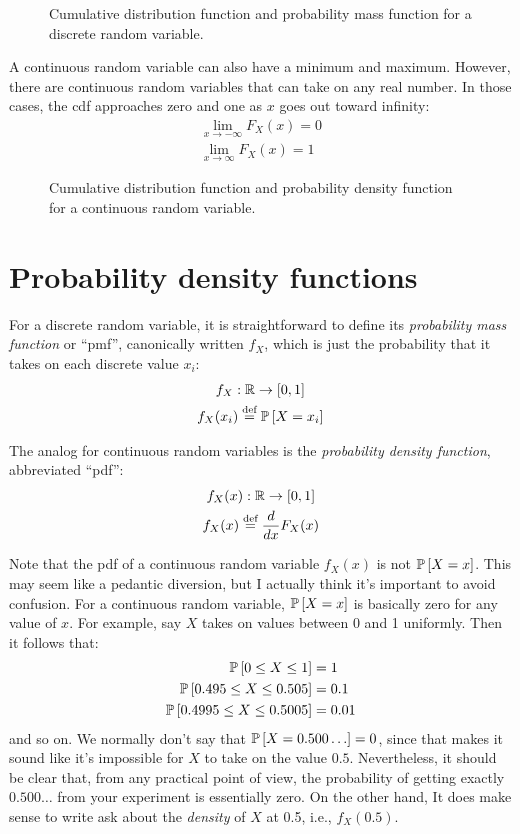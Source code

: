 \begin{figure}
    \centering
    \caption{Cumulative distribution function and probability mass function for a discrete random variable.}
    \label{fig:discrete-cdf}
\end{figure}

A continuous random variable can also have a minimum and maximum. However,
there are continuous random variables that can take on any real number. In
those cases, the cdf approaches zero and one as $x$ goes out toward infinity:
\begin{gather*}
\lim_{x \to -\infty} F_X(x) = 0 \\
\lim_{x \to \infty} F_X(x) = 1
\end{gather*}

\begin{figure}
    \centering
    \caption{Cumulative distribution function and probability density function for a continuous random variable.}
    \label{fig:continuous-pdf}
\end{figure}

\section{Probability density functions}

For a discrete random variable, it is straightforward to define its
\emph{probability mass function} or ``pmf'', canonically written $f_X$, which
is just the probability that it takes on each discrete value $x_i$:
\begin{gather*}
f_X : \mathbb{R} \to [0, 1] \\
f_X(x_i) \stackrel{\text{def}}{=} \mathbb{P}\left[{X = x_i}\right]
\end{gather*}

The analog for continuous random variables is the \emph{probability
density function},
abbreviated ``pdf'':
\begin{gather*}
f_X(x) : \mathbb{R} \to [0, 1] \\
f_X(x) \stackrel{\text{def}}{=} \frac{d}{dx} F_X(x)
\end{gather*}

Note that the pdf of a continuous random variable $f_X(x)$ is not $\mathbb{P}\left[{X =
x}\right]$. This may seem like a pedantic diversion, but I actually think it's
important to avoid confusion. For a continuous random variable, $\mathbb{P}\left[{X = x}\right]$
is basically zero for any value of $x$. For example, say $X$ takes on values
between 0 and 1 uniformly. Then it follows that:
\begin{align*}
\mathbb{P}\left[{0 \leq X \leq 1}\right] &= 1 \\
\mathbb{P}\left[{0.495 \leq X \leq 0.505}\right] &= 0.1 \\
\mathbb{P}\left[{0.4995 \leq X \leq 0.5005}\right] &= 0.01
\end{align*}
and so on. We normally don't say that $\mathbb{P}\left[{X = 0.500\ldots}\right] = 0$, since that
makes it sound like it's impossible for $X$ to take on the value $0.5$.
Nevertheless, it should be clear that, from any practical point of view, the
probability of getting exactly $0.500\ldots$ from your experiment is
essentially zero. On the other hand, It does make sense to write ask about the
\emph{density} of $X$ at 0.5, i.e., $f_X(0.5)$.

